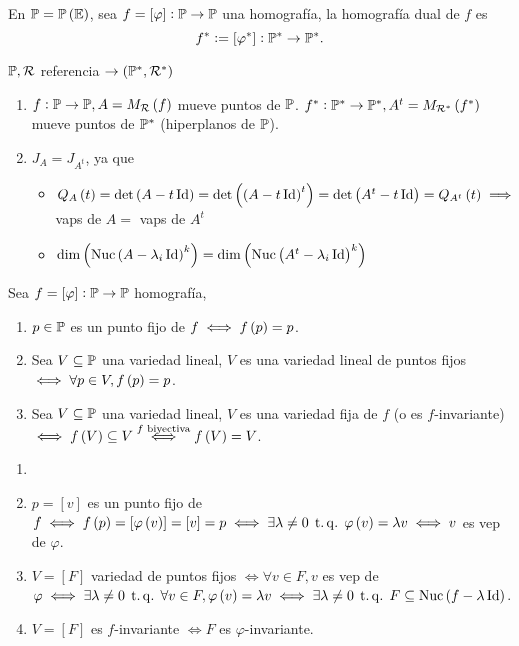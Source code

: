 \begin{defi}
    En $\mathbb{P} = \mathbb{P} \left(\mathbb{E}\right)$, sea $f = [\varphi] : \mathbb{P} \to \mathbb{P}$ una homografía, la homografía dual de $f$ es
    \[
        f^* := [\varphi^*] : \mathbb{P}^* \to \mathbb{P}^*.
    \]
\end{defi}
\begin{obs}
    $\mathbb{P}, \mathcal{R}$ referencia $\to \left(\mathbb{P}^*, \mathcal{R}^*\right)$
    \begin{enumerate}
        \item $f : \mathbb{P} \to \mathbb{P}, A = M_{\mathcal{R}} \left( f\right)$ mueve puntos de $\mathbb{P}$. $f^* : \mathbb{P}^* \to \mathbb{P}^*, A^t = M_{\mathcal{R}^\ast} \left( f^*\right)$ mueve puntos de $\mathbb{P}^*$ (hiperplanos de $\mathbb{P}$).
        \item $J_A = J_{A^t}$, ya que
            \begin{itemize}
            \item $Q_A \left( t \right) = \det\left( A- t\operatorname{Id}\right) = \det\left(\left( A-t\operatorname{Id}\right)^t\right) = \det\left( A^t-t\operatorname{Id}\right) = Q_{A^t} \left( t\right) \implies$ vaps de $A =$ vaps de $A^t$ 
            \item $\dim\left(\text{Nuc}\left( A-\lambda_i\operatorname{Id}\right)^k\right)=\dim\left(\text{Nuc}\left( A^t-\lambda_i\operatorname{Id}\right)^k\right)$
            \end{itemize}
    \end{enumerate}
\end{obs}
\begin{defi}
    Sea $f = [\varphi]: \mathbb{P} \to \mathbb{P}$ homografía,
    \begin{enumerate}
        \item $p \in \mathbb{P}$ es un punto fijo de $f \iff f\left( p \right) = p$.
        \item Sea $V \subseteq \mathbb{P}$ una variedad lineal, $V$ es una variedad lineal de puntos fijos $\iff \forall p \in V, f\left( p\right) = p$.
        \item Sea $V \subseteq \mathbb{P}$ una variedad lineal, $V$ es una variedad fija de $f$ (o es $f$-invariante) $\iff f\left( V\right) \subseteq V \stackrel{f \text{ biyectiva}}{\iff} f \left( V \right) = V$.
    \end{enumerate}
\end {defi}
\begin{obs}
    \begin{enumerate}
        \item[]
        \item $p = [v]$ es un punto fijo de $f \iff f\left( p\right) = [\varphi \left( v\right)] = [v] = p \iff \exists\lambda\neq 0 \operatorname{\;t.q.\;} \varphi\left( v\right)=\lambda v \iff v$ es vep de $\varphi$.
        \item $V=[F]$ variedad de puntos fijos $\iff \forall v \in F, v$ es vep de $\varphi \iff \exists\lambda\neq 0 \operatorname{\;t.q.\;} \forall v \in F, \varphi\left( v\right) = \lambda v \iff \exists \lambda \neq 0 \operatorname{\;t.q.\;} F \subseteq \text{Nuc}\left( f - \lambda\operatorname{Id}\right)$.
        \item $V = [F]$ es $f$-invariante $\iff F$ es $\varphi$-invariante.
    \end{enumerate}
\end{obs}
